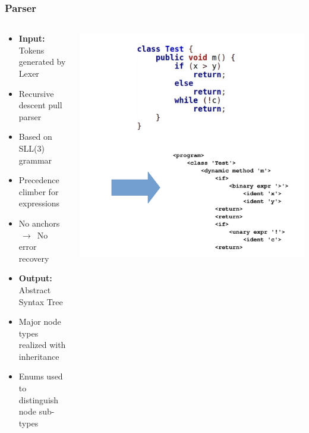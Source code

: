 \documentclass[navbaroff,en]{sdqbeamer}
\begin{document}
\begin{frame}
	\frametitle{Parser}

	\begin{columns}
		\begin{column}{0.45\textwidth}
			\begin{itemize}
				\item \textbf{Input:} Tokens generated by Lexer
				\item Recursive descent pull parser
				\item Based on SLL(3) grammar
				\item Precedence climber for expressions
				\item No anchors $\,\longrightarrow\,$ No error recovery

				\vspace{1em}

				\item \textbf{Output:} Abstract Syntax Tree
				\item Major node types realized with inheritance
				\item Enums used to distinguish node sub-types
			\end{itemize}
		\end{column}

		\begin{column}{0.54\textwidth}
			\centering \includegraphics[scale=0.24]{images/ast_example.pdf}
		\end{column}
	\end{columns}

\end{frame}
\end{document}
